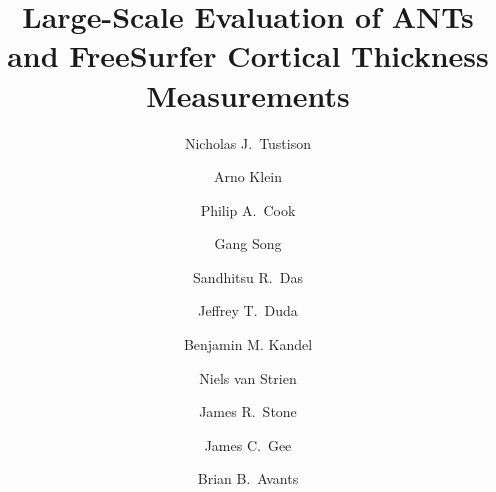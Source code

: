 \documentclass[final,5p,times,twocolumn]{elsarticle}
\begin{document}
\begin{frontmatter}

\title{Large-Scale Evaluation of ANTs and FreeSurfer Cortical Thickness Measurements}


\author[label1]{Nicholas J.~Tustison
  }
\author[label3]{Arno Klein}
\author[label2]{Philip A.~Cook}
\author[label2]{Gang Song}
\author[label2]{Sandhitsu R.~Das}
\author[label2]{Jeffrey T.~Duda}
\author[label2]{Benjamin M. Kandel}
\author[label3]{Niels van Strien}
\author[label1]{James R.~Stone}
\author[label2]{James C.~Gee}
\author[label2]{Brian B.~Avants}
\address[label1]{Department of Radiology and Medical Imaging, University of Virginia, Charlottesville, VA}
\address[label2]{Penn Image Computing and Science Laboratory, University of Pennsylvania,
                Philadelphia, PA}
\address[label3]{Sage Bionetworks, Seattle, WA}  
\address[label4]{Department of Circulation and Medical Imaging,
  Norwegian University of Science and Technology, Trondheim,
  Norway}
  








\end{frontmatter}
\end{document}
